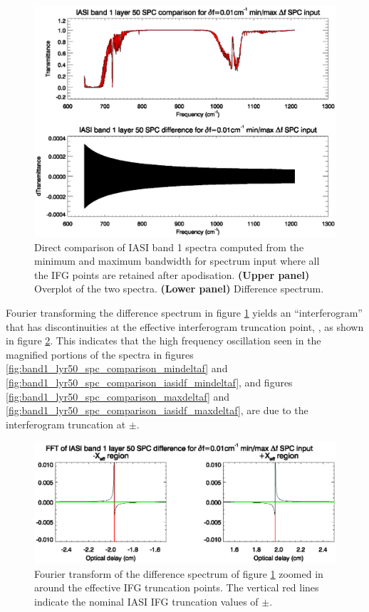 \begin{figure}[htp]
  \centering
  \includegraphics[scale=0.8]{graphics/band1_lyr50_spc_comparison_min-max_deltaf_0.01.eps}
  \caption{Direct comparison of IASI band 1 spectra computed from the minimum and maximum bandwidth for  spectrum input where all the IFG points are retained after apodisation. \textbf{(Upper panel)} Overplot of the two spectra. \textbf{(Lower panel)} Difference spectrum.}
  \label{fig:band1_lyr50_spc_comparison_min-max_deltaf_0.01}
\end{figure}

Fourier transforming the difference spectrum in figure \ref{fig:band1_lyr50_spc_comparison_min-max_deltaf_0.01} yields an ``interferogram'' that has discontinuities at the effective interferogram truncation point, \Xeff, as shown in figure \ref{fig:band1_lyr50_spc_min-max_deltaf_0.01_fft}. This indicates that the high frequency oscillation seen in the magnified portions of the spectra in figures \ref{fig:band1_lyr50_spc_comparison_mindeltaf} and \ref{fig:band1_lyr50_spc_comparison_iasidf_mindeltaf}, and figures \ref{fig:band1_lyr50_spc_comparison_maxdeltaf} and \ref{fig:band1_lyr50_spc_comparison_iasidf_maxdeltaf}, are due to the interferogram truncation at $\pm$\Dx.

\begin{figure}[htp]
  \centering
  \includegraphics[scale=0.8]{graphics/band1_lyr50_spc_min-max_deltaf_0.01_fft.eps}
  \caption{Fourier transform of the difference spectrum of figure \ref{fig:band1_lyr50_spc_comparison_min-max_deltaf_0.01} zoomed in around the effective IFG truncation points. The vertical red lines indicate the nominal IASI IFG truncation values of $\pm$\Xeff.}
  \label{fig:band1_lyr50_spc_min-max_deltaf_0.01_fft}
\end{figure}

